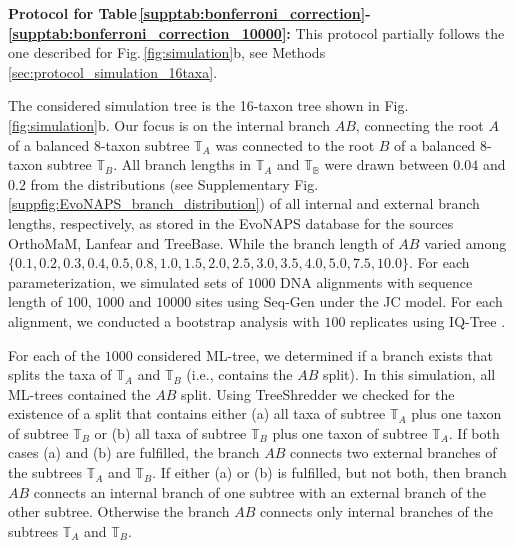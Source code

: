 \begin{appendices}
\noindent\textbf{Protocol for Table\,\ref{supptab:bonferroni_correction}-\,\ref{supptab:bonferroni_correction_10000}:} This protocol partially follows the one described for Fig.\,\ref{fig:simulation}b, see Methods \ref{sec:protocol_simulation_16taxa}.

The considered simulation tree is the 16-taxon tree shown in Fig.\,\ref{fig:simulation}b. Our focus is on the internal branch $AB$, connecting the root $A$ of a balanced $8$-taxon subtree $\mathbb{T}_A$ was connected to the root $B$ of a balanced $8$-taxon subtree $\mathbb{T}_B$. All branch lengths in $\mathbb{T}_A$ and $\mathbb{T_B}$ were drawn between $0.04$ and $0.2$ from the distributions (see Supplementary Fig.\,\ref{suppfig:EvoNAPS_branch_distribution}) of all internal and external branch lengths, respectively, as stored in the EvoNAPS database  for the sources OrthoMaM, Lanfear and TreeBase. While the branch length of $AB$ varied among $\{0.1, 0.2, 0.3, 0.4, 0.5, 0.8, 1.0, 1.5, 2.0, 2.5, 3.0, 3.5, 4.0, 5.0, 7.5, 10.0\}$. For each parameterization, we simulated sets of $1000$ DNA alignments with sequence length of $100$, $1000$ and $10000$ sites using Seq-Gen  under the JC model. For each alignment, we conducted a bootstrap analysis with $100$ replicates using IQ-Tree . 

For each of the $1000$ considered ML-tree, we determined if a branch exists that splits the taxa of $\mathbb{T}_A$ and $\mathbb{T}_B$ (i.e.,  contains the $AB$ split). In this simulation, all ML-trees contained the $AB$ split. {\color{olive}Using TreeShredder } we checked for the existence of a split that contains either (a) all taxa of subtree $\mathbb{T}_A$ plus one taxon of subtree $\mathbb{T}_B$ or (b) all taxa of subtree $\mathbb{T}_B$ plus one taxon of subtree $\mathbb{T}_A$. If both cases (a) and (b) are fulfilled, the branch $AB$ connects two external branches of the subtrees $\mathbb{T}_A$ and $\mathbb{T}_B$. If  either (a) or (b) is fulfilled, but not both, then  branch $AB$ connects an internal branch of one subtree with an external branch of the other subtree. Otherwise the branch $AB$ connects only internal branches of the subtrees $\mathbb{T}_A$ and $\mathbb{T}_B$.
\clearpage
\bigskip
    

\end{appendices}
